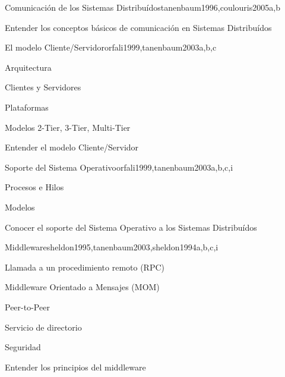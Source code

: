 \begin{syllabus}
\begin{unit}{Comunicación de los Sistemas Distribuídos}{tanenbaum1996,coulouris2005}{a,b}
   \begin{unitgoals}
      \item Entender los conceptos básicos de comunicación en Sistemas Distribuídos
   \end{unitgoals}
\end{unit}

\begin{unit}{El modelo Cliente/Servidor}{orfali1999,tanenbaum2003}{a,b,c}
   \begin{topics}
      \item Arquitectura
      \item Clientes y Servidores
      \item Plataformas
      \item Modelos 2-Tier, 3-Tier, Multi-Tier
   \end{topics}

   \begin{unitgoals}
      \item Entender el modelo Cliente/Servidor
   \end{unitgoals}
\end{unit}

\begin{unit}{Soporte del Sistema Operativo}{orfali1999,tanenbaum2003}{a,b,c,i}
   \begin{topics}
      \item Procesos e Hilos
      \item Modelos
   \end{topics}

   \begin{unitgoals}
      \item Conocer el soporte del Sistema Operativo a los Sistemas Distribuídos
   \end{unitgoals}
\end{unit}

\begin{unit}{Middleware}{sheldon1995,tanenbaum2003,sheldon1994}{a,b,c,i}
   \begin{topics}
      \item Llamada a un procedimiento remoto (RPC)
      \item Middleware Orientado a Mensajes (MOM)
      \item Peer-to-Peer
      \item Servicio de directorio
      \item Seguridad
   \end{topics}

   \begin{unitgoals}
      \item Entender los principios del middleware
   \end{unitgoals}
\end{unit}


\end{syllabus}
